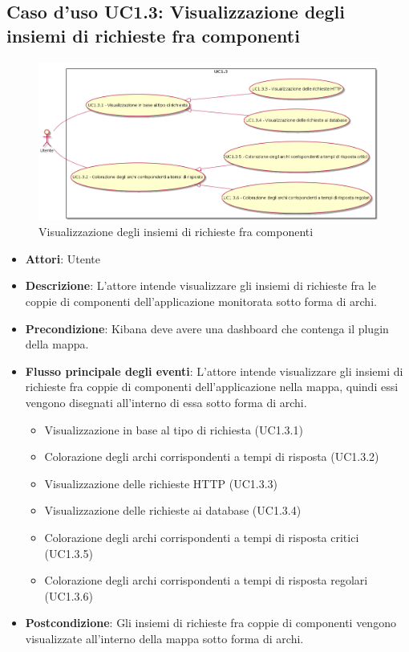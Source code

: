 \subsection{Caso d'uso UC1.3: Visualizzazione degli insiemi di richieste fra componenti}
\begin{figure} [H]
	\centering
	\includegraphics[scale=0.40]{./UC/UC1-3.png}
	\caption{Visualizzazione degli insiemi di richieste fra componenti}\label{}
\end{figure}
\begin{itemize}
	\item \textbf{Attori}: Utente
	\item \textbf{Descrizione}: L'attore intende visualizzare gli insiemi di richieste fra le coppie di componenti dell'applicazione monitorata sotto forma di archi.
	\item \textbf{Precondizione}: Kibana deve avere una dashboard che contenga il plugin della mappa.
	\item \textbf{Flusso principale degli eventi}: L'attore intende visualizzare gli insiemi di richieste fra coppie di componenti dell'applicazione nella mappa, quindi essi vengono disegnati all'interno di essa sotto forma di archi.
	\begin{itemize}
		\item Visualizzazione in base al tipo di richiesta (UC1.3.1)
		\item Colorazione degli archi corrispondenti a tempi di risposta (UC1.3.2)
		\item Visualizzazione delle richieste HTTP (UC1.3.3)
		\item Visualizzazione delle richieste ai database (UC1.3.4)
		\item Colorazione degli archi corrispondenti a tempi di risposta critici (UC1.3.5)
		\item Colorazione degli archi corrispondenti a tempi di risposta regolari (UC1.3.6)
	\end{itemize}
	\item \textbf{Postcondizione}: Gli insiemi di richieste fra coppie di componenti vengono visualizzate all'interno della mappa sotto forma di archi.
\end{itemize}
